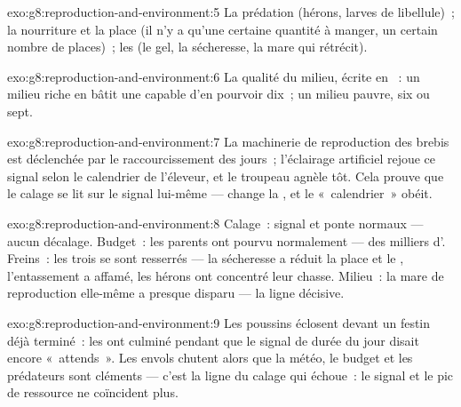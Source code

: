 \begin{solution}{exo:g8:reproduction-and-environment:5}
La prédation (hérons, larves de libellule)~; la nourriture et la
place (il n'y a qu'une certaine quantité à manger, un certain nombre
de places)~; les  (le gel, la sécheresse, la mare qui
rétrécit).
\end{solution}

\begin{solution}{exo:g8:reproduction-and-environment:6}
La qualité du milieu, écrite en ~: un milieu riche en 
bâtit une  capable d'en pourvoir dix~; un milieu pauvre, six
ou sept.
\end{solution}

\begin{solution}{exo:g8:reproduction-and-environment:7}
La machinerie de reproduction des brebis est déclenchée par le
raccourcissement des jours~; l'éclairage artificiel rejoue ce signal
selon le calendrier de l'éleveur, et le troupeau agnèle tôt. Cela
prouve que le calage se lit sur le signal lui-même --- change la
, et le «~calendrier~» obéit.
\end{solution}

\begin{solution}{exo:g8:reproduction-and-environment:8}
Calage~: signal et ponte normaux --- aucun décalage. Budget~: les
parents ont pourvu normalement --- des milliers d'. Freins~: les
trois se sont resserrés --- la sécheresse a réduit la place et le
, l'entassement a affamé, les hérons ont concentré leur
chasse. Milieu~: la mare de reproduction elle-même a presque disparu
--- la ligne décisive.
\end{solution}

\begin{solution}{exo:g8:reproduction-and-environment:9}
Les poussins éclosent devant un festin déjà terminé~: les 
ont culminé pendant que le signal de durée du jour disait encore
«~attends~». Les envols chutent alors que la météo, le budget et les
prédateurs sont cléments --- c'est la ligne du calage qui échoue~:
le signal et le pic de ressource ne coïncident plus.
\end{solution}

